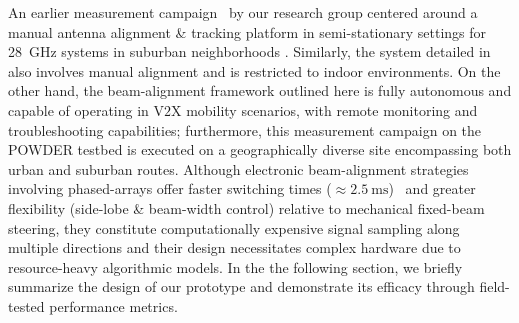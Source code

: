 \documentclass[10pt,twocolumn]{IEEEtran}
\begin{document}
An earlier measurement campaign~\cite{Purdue} by our research group centered around a manual antenna alignment \& tracking platform in semi-stationary settings for \SI{28}{\giga\hertz} systems in suburban neighborhoods%
. Similarly, the system detailed in~\cite{Harvard} also involves manual alignment and is restricted to indoor environments. On the other hand, the beam-alignment framework outlined here is fully autonomous and capable of operating in V$2$X mobility scenarios, with remote monitoring and troubleshooting capabilities; furthermore, this measurement campaign on the POWDER testbed is executed on a geographically diverse site encompassing both urban and suburban routes. Although electronic beam-alignment strategies involving phased-arrays offer faster switching times (${\approx}\SI{2.5}{\milli\second}$)~\cite{Agile-Link} and greater flexibility (side-lobe \& beam-width control) relative to mechanical fixed-beam steering, they constitute computationally expensive signal sampling along multiple directions and their design necessitates complex hardware due to resource-heavy algorithmic models. In the the following section, we briefly summarize the design of our prototype and demonstrate its efficacy through field-tested performance metrics.
\end{document}
